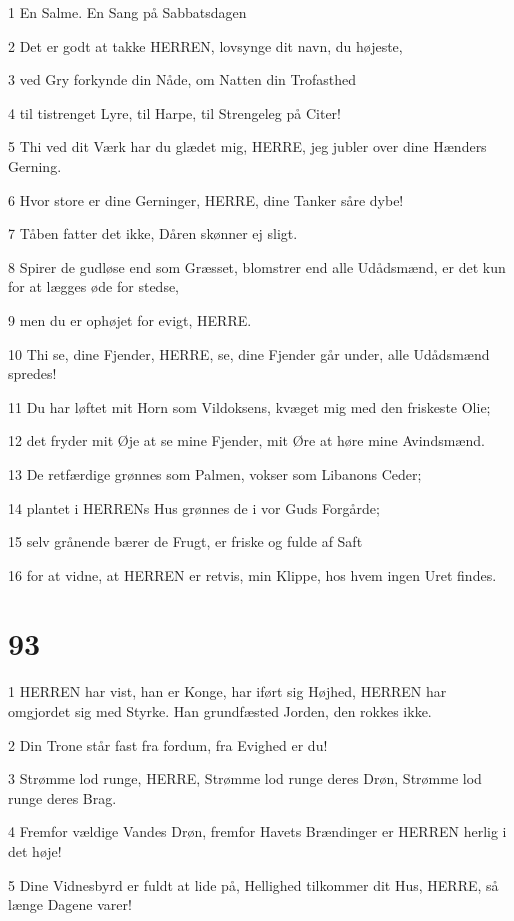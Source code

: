 \par 1 En Salme. En Sang på Sabbatsdagen
\par 2 Det er godt at takke HERREN, lovsynge dit navn, du højeste,
\par 3 ved Gry forkynde din Nåde, om Natten din Trofasthed
\par 4 til tistrenget Lyre, til Harpe, til Strengeleg på Citer!
\par 5 Thi ved dit Værk har du glædet mig, HERRE, jeg jubler over dine Hænders Gerning.
\par 6 Hvor store er dine Gerninger, HERRE, dine Tanker såre dybe!
\par 7 Tåben fatter det ikke, Dåren skønner ej sligt.
\par 8 Spirer de gudløse end som Græsset, blomstrer end alle Udådsmænd, er det kun for at lægges øde for stedse,
\par 9 men du er ophøjet for evigt, HERRE.
\par 10 Thi se, dine Fjender, HERRE, se, dine Fjender går under, alle Udådsmænd spredes!
\par 11 Du har løftet mit Horn som Vildoksens, kvæget mig med den friskeste Olie;
\par 12 det fryder mit Øje at se mine Fjender, mit Øre at høre mine Avindsmænd.
\par 13 De retfærdige grønnes som Palmen, vokser som Libanons Ceder;
\par 14 plantet i HERRENs Hus grønnes de i vor Guds Forgårde;
\par 15 selv grånende bærer de Frugt, er friske og fulde af Saft
\par 16 for at vidne, at HERREN er retvis, min Klippe, hos hvem ingen Uret findes.

\chapter{93}

\par 1 HERREN har vist, han er Konge, har iført sig Højhed, HERREN har omgjordet sig med Styrke. Han grundfæsted Jorden, den rokkes ikke.
\par 2 Din Trone står fast fra fordum, fra Evighed er du!
\par 3 Strømme lod runge, HERRE, Strømme lod runge deres Drøn, Strømme lod runge deres Brag.
\par 4 Fremfor vældige Vandes Drøn, fremfor Havets Brændinger er HERREN herlig i det høje!
\par 5 Dine Vidnesbyrd er fuldt at lide på, Hellighed tilkommer dit Hus, HERRE, så længe Dagene varer!

